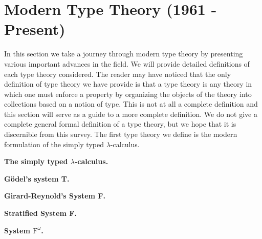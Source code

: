 \section{Modern Type Theory (1961 - Present)}
\label{sec:moderen_type_theory}
In this section we take a journey through modern type theory by
presenting various important advances in the field.  We will provide
detailed definitions of each type theory considered.  The reader may
have noticed that the only definition of type theory we have provide
is that a type theory is any theory in which one must enforce a
property by organizing the objects of the theory into collections
based on a notion of type.  This is not at all a complete definition
and this section will serve as a guide to a more complete definition.
We do not give a complete general formal definition of a type theory,
but we hope that it is discernible from this survey.  The first type
theory we define is the modern formulation of the simply typed
$\lambda$-calculus.

\textbf{The simply typed $\lambda$-calculus.} 


\textbf{G\"odel's system T.} 

\textbf{Girard-Reynold's System F.} 

\textbf{Stratified System F.} 

\textbf{System $\text{F}^\omega$.}   

